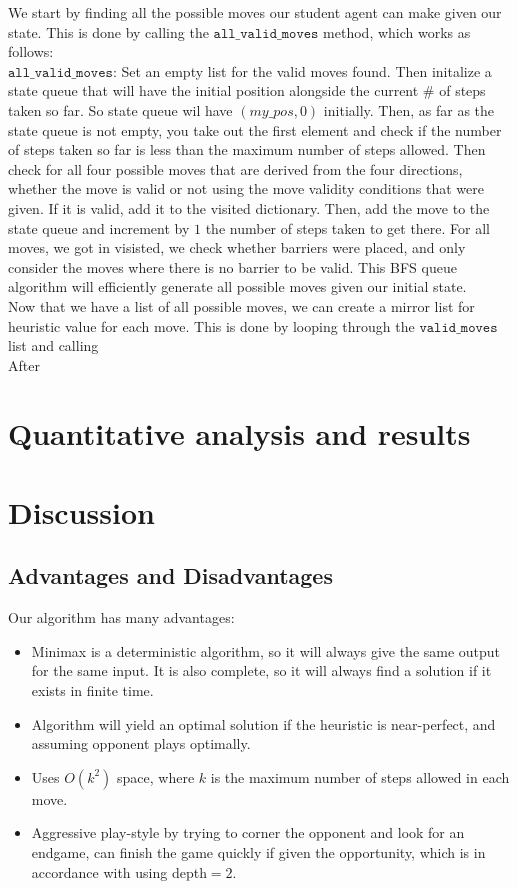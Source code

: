 \documentclass[11pt]{article}
\begin{document}
We start by finding all the possible moves our student agent can make given our state. This is done by calling the $\texttt{all\_valid\_moves}$ method, which works as follows:
\\

$\texttt{all\_valid\_moves}$: Set an empty list for the valid moves found. Then initalize a state queue that will have the initial position alongside the current \# of steps taken so far. So state queue
wil have $(my\_pos, 0)$ initially. Then, as far as the state queue is not empty, you take out the first element and check if the number of steps taken so far is less than the maximum number of steps allowed. Then check for all four possible moves that are derived from the four directions,
whether the move is valid or not using the move validity conditions that were given. If it is valid, add it to the visited dictionary. Then, add the move to the state queue and increment by $1$ the number of steps taken to get there. For all moves, we got in visisted, we check whether barriers were placed, and only consider the moves where there is no barrier to be valid.
This BFS queue algorithm will efficiently generate all possible moves given our initial state.
\\

Now that we have a list of all possible moves, we can create a mirror list for heuristic value for each move. This is done by looping through the $\texttt{valid\_moves}$ list and calling
\\

After 

\section{Quantitative analysis and results}

\section{Discussion}

\subsection{Advantages and Disadvantages}

Our algorithm has many advantages:

\begin{itemize}
    \item Minimax is a deterministic algorithm, so it will always give the same output for the same input. It is also complete, so it will always find a solution if it exists in finite time.
    \item Algorithm will yield an optimal solution if the heuristic is near-perfect, and assuming opponent plays optimally.
    \item Uses $O(k^2)$ space, where $k$ is the maximum number of steps allowed in each move.
    \item Aggressive play-style by trying to corner the opponent and look for an endgame, can finish the game quickly if given the opportunity, which is in accordance with using depth$=2$.
\end{itemize}
\end{document}
